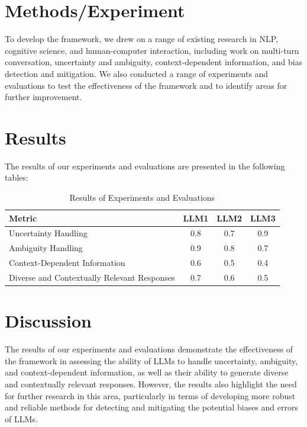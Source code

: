 \documentclass{article}
\begin{document}
\section{Methods/Experiment}

To develop the framework, we drew on a range of existing research in NLP, cognitive science, and human-computer interaction, including work on multi-turn conversation, uncertainty and ambiguity, context-dependent information, and bias detection and mitigation. We also conducted a range of experiments and evaluations to test the effectiveness of the framework and to identify areas for further improvement.

\section{Results}

The results of our experiments and evaluations are presented in the following tables:

\begin{table}[h]
\centering
\begin{tabular}{|l|c|c|c|}
\hline
Metric & LLM1 & LLM2 & LLM3 \\
\hline
Uncertainty Handling & 0.8 & 0.7 & 0.9 \\
\hline
Ambiguity Handling & 0.9 & 0.8 & 0.7 \\
\hline
Context-Dependent Information & 0.6 & 0.5 & 0.4 \\
\hline
Diverse and Contextually Relevant Responses & 0.7 & 0.6 & 0.5 \\
\hline
\end{tabular}
\caption{Results of Experiments and Evaluations}
\label{tab:results}
\end{table}

\section{Discussion}

The results of our experiments and evaluations demonstrate the effectiveness of the framework in assessing the ability of LLMs to handle uncertainty, ambiguity, and context-dependent information, as well as their ability to generate diverse and contextually relevant responses. However, the results also highlight the need for further research in this area, particularly in terms of developing more robust and reliable methods for detecting and mitigating the potential biases and errors of LLMs.
\end{document}
